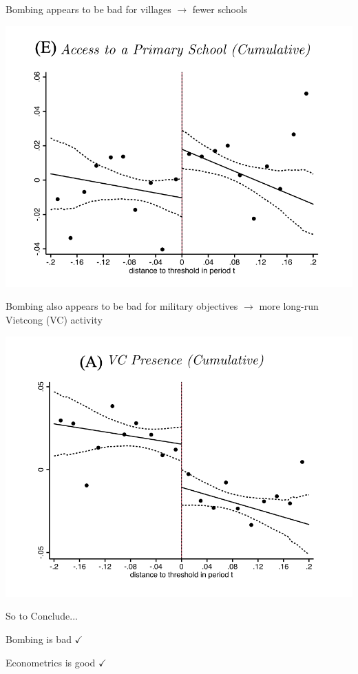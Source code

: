 \documentclass[11pt,english,handout]{beamer}
\newenvironment{wideitemize}{\itemize\addtolength{\itemsep}{10pt}}{\enditemize}
\begin{document}
\begin{frame}

\begin{wideitemize}
	\item
	Bombing appears to be bad for villages $\rightarrow$ fewer schools
\end{wideitemize}

\centering 
\includegraphics[width = 0.7\linewidth]{dell-schools}	
\end{frame}

\begin{frame}
	
	\begin{wideitemize}
		\item
		Bombing also appears to be bad for military objectives $\rightarrow$ more long-run Vietcong (VC) activity
	\end{wideitemize}
	
	\centering 
	\includegraphics[width = 0.7\linewidth]{dell-vc}	
\end{frame}

\begin{frame}{So to Conclude...}
	\begin{wideitemize}
		\item
		Bombing is bad $\checkmark$
		
		\item
		Econometrics is good $\checkmark$
		
	\end{wideitemize}
\end{frame}
\end{document}
